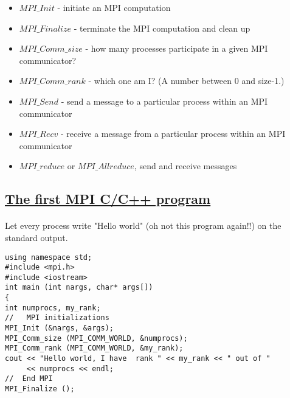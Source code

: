 \documentclass[%
oneside,                 %
final,                   %
10pt]{article}
\begin{document}
\begin{itemize}
\item $MPI\_Init$ - initiate an MPI computation

\item $MPI\_Finalize$ - terminate the MPI computation and clean up

\item $MPI\_Comm\_size$ - how many processes participate in a given MPI communicator?

\item $MPI\_Comm\_rank$ - which one am I? (A number between 0 and size-1.)

\item $MPI\_Send$ - send a message to a particular process within an MPI communicator

\item $MPI\_Recv$ - receive a message from a particular process within an MPI communicator

\item $MPI\_reduce$  or $MPI\_Allreduce$, send and receive messages
\end{itemize}

\noindent



\subsection*{\href{{https://github.com/CompPhysics/ComputationalPhysics2/blob/gh-pages/doc/Programs/LecturePrograms/programs/MPI/chapter07/program2.cpp}}{The first MPI C/C++ program}}

\paragraph{}

Let every process write "Hello world" (oh not this program again!!) on the standard output. 















\begin{verbatim}
using namespace std;
#include <mpi.h>
#include <iostream>
int main (int nargs, char* args[])
{
int numprocs, my_rank;
//   MPI initializations
MPI_Init (&nargs, &args);
MPI_Comm_size (MPI_COMM_WORLD, &numprocs);
MPI_Comm_rank (MPI_COMM_WORLD, &my_rank);
cout << "Hello world, I have  rank " << my_rank << " out of " 
     << numprocs << endl;
//  End MPI
MPI_Finalize ();

\end{verbatim}
\end{document}
